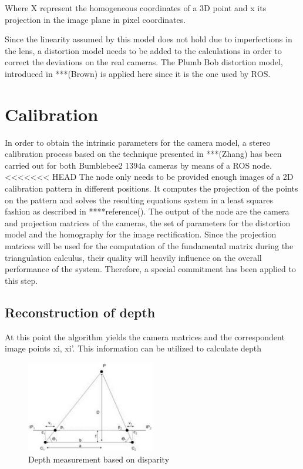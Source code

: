 Where X represent the homogeneous coordinates of a 3D point and x its projection in the image plane in pixel coordinates.

Since the linearity assumed by this model does not hold due to imperfections in the lens, a distortion model needs to be added to the calculations in order to correct the deviations on the real cameras. The Plumb Bob distortion model, introduced in ***(Brown) is applied here since it is the one used by ROS.

\section{Calibration}
In order to obtain the intrinsic parameters for the camera model, a stereo calibration process based on the technique presented in ***(Zhang) has been carried out for both Bumblebee2 1394a cameras by means of a ROS node. 
<<<<<<< HEAD
The node only needs to be provided enough images of a 2D calibration pattern in different positions. It computes the projection of the points on the pattern and solves the resulting equations system in a least squares fashion as described in ****reference(). The output of the node are the camera and projection matrices of the cameras, the set of parameters for the distortion model and the homography for the image rectification. Since the projection matrices will be used for the computation of the fundamental matrix during the triangulation calculus, their quality will heavily influence on the overall performance of the system. Therefore, a special commitment has been applied to this step. 


\subsection{Reconstruction of depth}
At this point the algorithm yields the camera matrices and the correspondent image points {xi, xi'}. This information can be utilized to calculate depth 


\begin{figure}[h]
    \centering
    \includegraphics[width=0.5\textwidth]{images/triangulate}
    \caption{Depth measurement based on disparity}
    \label{fig:Depth_disparity}
\end{figure}



